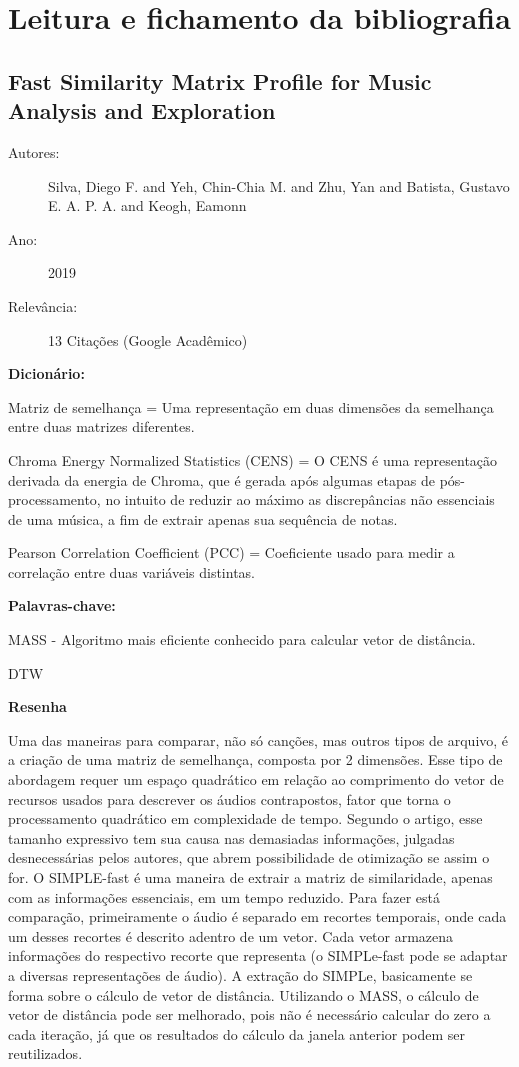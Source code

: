 \chapter{Leitura e fichamento da bibliografia}

\section{Fast Similarity Matrix Profile for Music Analysis and Exploration}

\begin{description}
\item[Autores:] Silva, Diego F. and Yeh, Chin-Chia M. and Zhu, Yan and Batista, Gustavo E. A. P. A. and Keogh, Eamonn
\item[Ano:] 2019
\item[Relevância:] 13 Citações (Google Acadêmico)
\end{description}

{\bfseries Dicionário:}

\item Matriz de semelhança = Uma representação em duas dimensões da semelhança entre duas matrizes diferentes.
\item Chroma Energy Normalized Statistics (CENS) = O CENS é uma representação derivada da energia de Chroma, que é gerada após algumas etapas de pós-processamento, no intuito de reduzir ao máximo as discrepâncias não essenciais de uma música, a fim de extrair apenas sua sequência de notas.
\item Pearson Correlation Coefficient (PCC) = Coeficiente usado para medir a correlação entre duas variáveis distintas.

{\bfseries Palavras-chave:}

\item MASS - Algoritmo mais eficiente conhecido para calcular vetor de distância.
\item DTW

{\bfseries Resenha}

Uma das maneiras para comparar, não só canções, mas outros tipos de arquivo, é a criação de uma matriz de semelhança, composta por 2 dimensões. Esse tipo de abordagem requer um espaço quadrático em relação ao comprimento do vetor de recursos usados para descrever os áudios contrapostos, fator que torna o processamento quadrático em complexidade de tempo. Segundo o artigo, esse tamanho expressivo tem sua causa nas demasiadas informações, julgadas desnecessárias pelos autores, que abrem possibilidade de otimização se assim o for. O SIMPLE-fast é uma maneira de extrair a matriz de similaridade, apenas com as informações essenciais, em um tempo reduzido.
Para fazer está comparação, primeiramente o áudio é separado em recortes temporais, onde cada um desses recortes é descrito adentro de um vetor. Cada vetor armazena informações do respectivo recorte que representa (o SIMPLe-fast pode se adaptar a diversas representações de áudio). A extração do SIMPLe, basicamente se forma sobre o cálculo de vetor de distância. Utilizando o MASS, o cálculo de vetor de distância pode ser melhorado, pois não é necessário calcular do zero a cada iteração, já que os resultados do cálculo da janela anterior podem ser reutilizados. 

